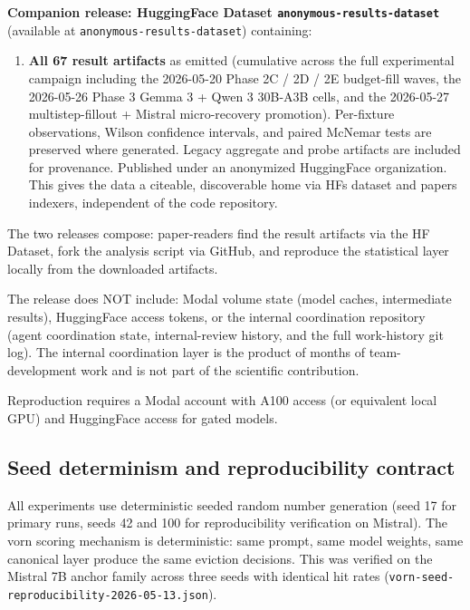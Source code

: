 \documentclass[10pt]{article}
\providecommand{\tightlist}{%
 \setlength{\itemsep}{0pt}\setlength{\parskip}{0pt}}
\begin{document}
\textbf{Companion release: HuggingFace Dataset
\texttt{anonymous-results-dataset}} (available at
\texttt{anonymous-results-dataset})
containing:

\begin{enumerate}
\def\labelenumi{\arabic{enumi}.}
\setcounter{enumi}{3}
\tightlist
\item
 \textbf{All 67 result artifacts} as emitted (cumulative across the
 full experimental campaign including the 2026-05-20 Phase 2C / 2D /
 2E budget-fill waves, the 2026-05-26 Phase 3 Gemma 3 + Qwen 3 30B-A3B
 cells, and the 2026-05-27 multistep-fillout + Mistral micro-recovery
 promotion). Per-fixture observations, Wilson
 confidence intervals, and paired McNemar tests are preserved where
 generated. Legacy aggregate and probe artifacts are included for
 provenance. Published under an anonymized HuggingFace
 organization. This gives the data a citeable, discoverable home via
 HF\textquotesingle s dataset and papers indexers, independent of the
 code repository.
\end{enumerate}

The two releases compose: paper-readers find the result artifacts via
the HF Dataset, fork the analysis script via GitHub, and reproduce the
statistical layer locally from the downloaded artifacts.

The release does NOT include: Modal volume state (model caches,
intermediate results), HuggingFace access tokens, or the internal
coordination repository (agent coordination state, internal-review
history, and the full work-history git log). The internal coordination
layer is the product of months of team-development work and is not part
of the scientific contribution.

Reproduction requires a Modal account with A100 access (or equivalent
local GPU) and HuggingFace access for gated models.

\subsection{Seed determinism and reproducibility contract}\label{a9-seed-determinism-and-reproducibility-contract}

All experiments use deterministic seeded random number generation (seed
17 for primary runs, seeds 42 and 100 for reproducibility verification
on Mistral). The vorn scoring mechanism is deterministic: same prompt,
same model weights, same canonical layer produce the same eviction
decisions. This was verified on the Mistral 7B anchor family across
three seeds with identical hit rates
(\texttt{vorn-seed-reproducibility-2026-05-13.\allowbreak{}json}).
\end{document}
